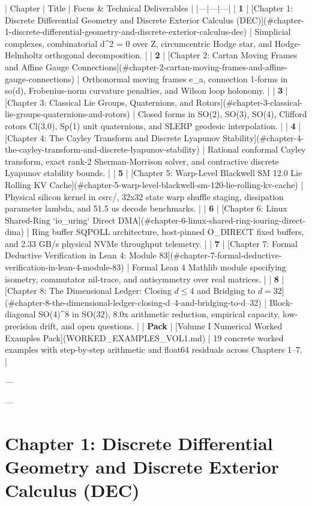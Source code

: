 \documentclass[11pt,twoside,openright]{amsbook}
\begin{document}
| Chapter | Title | Focus & Technical Deliverables |
|---|---|---|
| \textbf{1} | [Chapter 1: Discrete Differential Geometry and Discrete Exterior Calculus (DEC)](#chapter-1-discrete-differential-geometry-and-discrete-exterior-calculus-dec) | Simplicial complexes, combinatorial d^2 = 0 over Z, circumcentric Hodge star, and Hodge-Helmholtz orthogonal decomposition. |
| \textbf{2} | [Chapter 2: Cartan Moving Frames and Affine Gauge Connections](#chapter-2-cartan-moving-frames-and-affine-gauge-connections) | Orthonormal moving frames e_a, connection 1-forms in so(d), Frobenius-norm curvature penalties, and Wilson loop holonomy. |
| \textbf{3} | [Chapter 3: Classical Lie Groups, Quaternions, and Rotors](#chapter-3-classical-lie-groups-quaternions-and-rotors) | Closed forms in SO(2), SO(3), SO(4), Clifford rotors Cl(3,0), Sp(1) unit quaternions, and SLERP geodesic interpolation. |
| \textbf{4} | [Chapter 4: The Cayley Transform and Discrete Lyapunov Stability](#chapter-4-the-cayley-transform-and-discrete-lyapunov-stability) | Rational conformal Cayley transform, exact rank-2 Sherman-Morrison solver, and contractive discrete Lyapunov stability bounds. |
| \textbf{5} | [Chapter 5: Warp-Level Blackwell SM 12.0 Lie Rolling KV Cache](#chapter-5-warp-level-blackwell-sm-120-lie-rolling-kv-cache) | Physical silicon kernel in csrc/, 32x32 state warp shuffle staging, dissipation parameter lambda, and 51.5 us decode benchmarks. |
| \textbf{6} | [Chapter 6: Linux Shared-Ring `io_uring` Direct DMA](#chapter-6-linux-shared-ring-iouring-direct-dma) | Ring buffer SQPOLL architecture, host-pinned O_DIRECT fixed buffers, and 2.33 GB/s physical NVMe throughput telemetry. |
| \textbf{7} | [Chapter 7: Formal Deductive Verification in Lean 4: Module 83](#chapter-7-formal-deductive-verification-in-lean-4-module-83) | Formal Lean 4 Mathlib module specifying isometry, commutator nil-trace, and antisymmetry over real matrices. |
| \textbf{8} | [Chapter 8: The Dimensional Ledger: Closing $d \le 4$ and Bridging to $d = 32$](#chapter-8-the-dimensional-ledger-closing-d--4-and-bridging-to-d--32) | Block-diagonal SO(4)^8 in SO(32), 8.0x arithmetic reduction, empirical capacity, low-precision drift, and open questions. |
| \textbf{Pack} | [Volume I Numerical Worked Examples Pack](WORKED_EXAMPLES_VOL1.md) | 19 concrete worked examples with step-by-step arithmetic and float64 residuals across Chapters 1–7. |

---



---

\chapter{Chapter 1: Discrete Differential Geometry and Discrete Exterior Calculus (DEC)}
\end{document}
